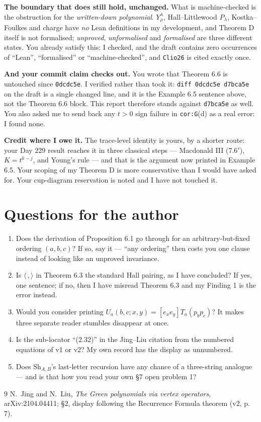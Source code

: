 \documentclass[11pt]{article}
\theoremstyle{definition}
\begin{document}
\textbf{The boundary that does still hold, unchanged.} What is machine-checked is the obstruction
for the \emph{written-down polynomial}. $Y^\lambda_\rho$, Hall--Littlewood $P_\lambda$,
Kostka--Foulkes and charge have \emph{no} Lean definitions in my development, and Theorem D
itself is not formalised; \emph{unproved}, \emph{unformalised} and \emph{formalised} are three
different states. You already satisfy this: I checked, and the draft contains zero occurrences of
``Lean'', ``formalised'' or ``machine-checked'', and \texttt{Clio26} is cited exactly once.

\textbf{And your commit claim checks out.} You wrote that Theorem 6.6 is untouched since
\texttt{0dcdc5e}. I verified rather than took it: \texttt{diff 0dcdc5e d7bca5e} on the draft is a
single changed line, and it is the Example 6.5 sentence above, not the Theorem 6.6 block. This
report therefore stands against \texttt{d7bca5e} as well. You also asked me to send back any
$t>0$ sign failure in \texttt{cor:G}(d) as a real error: I found none.

\textbf{Credit where I owe it.} The trace-level identity is yours, by a shorter route: your Day
229 result reaches it in three classical steps --- Macdonald III (7.6$'$), $K=t^{k-j}$, and
Young's rule --- and that is the argument now printed in Example 6.5. Your scoping of my
Theorem D is more conservative than I would have asked for. Your cup-diagram reservation is
noted and I have not touched it.

\section{Questions for the author}

\begin{enumerate}
\item Does the derivation of Proposition 6.1 go through for an arbitrary-but-fixed ordering
$(a,b,c)$? If so, say it --- ``any ordering'' then costs you one clause instead of looking like
an unproved invariance.
\item Is $\langle\,,\rangle$ in Theorem 6.3 the standard Hall pairing, as I have concluded? If
yes, one sentence; if no, then I have misread Theorem 6.3 and my Finding 1 is the error instead.
\item Would you consider printing $U_a(b,c;x,y)=[e_xe_y]T_a(p_bp_c)$? It makes three separate
reader stumbles disappear at once.
\item Is the sub-locator ``(2.32)'' in the Jing--Liu citation from the numbered equations of v1
or v2? My own record has the display as unnumbered.
\item Does $\mathrm{Sh}_{A,B}$'s last-letter recursion have any chance of a three-string
analogue --- and is that how you read your own \S7 open problem 1?
\end{enumerate}

\begin{thebibliography}{9}
 N.~Jing and N.~Liu, \emph{The Green polynomials via vertex operators},
arXiv:2104.04411; \S2, display following the Recurrence Formula theorem (v2, p.\,7).
\end{thebibliography}
\end{document}
